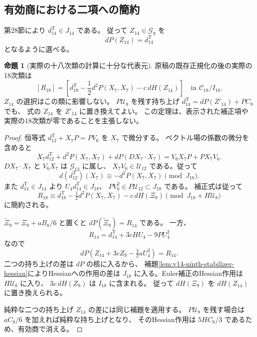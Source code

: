 \documentclass[a4paper,11pt]{ltjsarticle}
\theoremstyle{definition}
\newtheorem{theorem}{命題}[section]
\begin{document}
\subsection{有効商における二項への簡約}

第28節により $d^{\mathrm T}_{14}\in J_{14}$ である。
従って $Z_{14}\in\mathcal G_9$ を
\[
 dP(Z_{14})=d^{\mathrm T}_{14}
\]
となるように選べる。

\begin{theorem}[実際の十八次類の計算に十分な代表元]
\label{thm:v14-eighteenth-effective-representative}
原稿の既存正規化の後の実際の18次類は
\begin{equation}\label{eq:v14-eighteen-effective-representative}
 \boxed{\displaystyle
 [R_{18}]=\left[
 d^{\mathrm T}_{18}-\frac12d^2P(X_7,X_7)-c\,dH(Z_{14})
 \right]\quad\text{in }\mathcal C_{18}/I_{18}.
 }
\end{equation}
$Z_{14}$ の選択はこの類に影響しない。
$P\mathcal U_8$ を残す持ち上げ
$d^{\mathrm T}_{14}=dP(Z'_{14})+PC_8$ でも、
式の $Z_{14}$ を $Z'_{14}$ に置き換えてよい。
この定理は、表示された補正項や実際の18次類が零であることを主張しない。
\end{theorem}

\begin{proof}
恒等式 $d^{\mathrm T}_{12}+X_7P=PV_6$ を $X_7$ で微分する。
ベクトル場の係数の微分を含めると
\[
 X_7d^{\mathrm T}_{12}+d^2P(X_7,X_7)
       +dP(DX_7\cdot X_7)
 =V_6X_7P+P X_7V_6.
\]
$DX_7\cdot X_7$ と $V_6X_7$ は $\mathcal G_{13}$ に属し、
$X_7V_6\in\mathcal U_{12}$ である。従って
\[
 d(d^{\mathrm T}_{12})(X_7)
    \equiv-d^2P(X_7,X_7)\pmod{J_{18}}.
\]
また $d^{\mathrm T}_{14}\in J_{14}$ より
$U_4d^{\mathrm T}_{14}\in J_{18}$、
$PV_6^2\in P\mathcal U_{12}\subset J_{18}$ である。
補正式は従って
\[
 R_{18}\equiv d^{\mathrm T}_{18}-\tfrac12d^2P(X_7,X_7)
                       -c\,dH(\Xi_9)\pmod{J_{18}+H\mathcal U_8}
\]
に簡約される。

$\widetilde\Xi_9=\Xi_9+aB_8/6$ と置くと
$dP(\widetilde\Xi_9)=R_{14}$ である。
一方、
\[
 R_{14}=d^{\mathrm T}_{14}+3cHU_4-9PU_4^2
\]
なので
\[
 dP\left(Z_{14}+3cZ_9-\tfrac32aU_4^2\right)=R_{14}.
\]
二つの持ち上げの差は $dP$ の核に入るから、
補題\ref{lem:v14-ninth-stabilizer-hessian}によりHessianへの作用の差は
$J_{18}$ に入る。Euler補正のHessian作用は $H\mathcal U_8$ に入り、
$3c\,dH(Z_9)$ は $I_{18}$ に含まれる。
従って $dH(\Xi_9)$ を $dH(Z_{14})$ に置き換えられる。

純粋な二つの持ち上げ $Z_{14}$ の差には同じ補題を適用する。
$P\mathcal U_8$ を残す場合は $aC_8/6$ を加えれば純粋な持ち上げとなり、
そのHessian作用は $5HC_8/3$ であるため、有効商で消える。
\end{proof}
\end{document}
